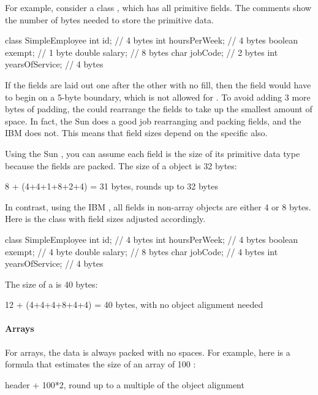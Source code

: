 For example, consider a class , which has all primitive fields.
The comments show the number of bytes needed to store the primitive data.

\begin{shortlisting}
class SimpleEmployee {
    int id;               // 4 bytes
    int hoursPerWeek;     // 4 bytes       
    boolean exempt;       // 1 byte          
    double salary;        // 8 bytes          
    char jobCode;         // 2 bytes           
    int yearsOfService;   // 4 bytes      	
}
\end{shortlisting}

If the fields are laid out one after the other with no fill, then the
field  would have to begin on a 5-byte boundary, which is not allowed for
. To avoid adding 3 more bytes of padding, the \jre could rearrange the fields
to take up the smallest amount of space. In fact, the Sun \jre does a good job rearranging and
packing fields, and the IBM \jre does not. This means that field sizes depend on the specific \jre also. 

Using the Sun \jre, you can assume each field is the size of its primitive data type because the fields are packed. The size of a
 object is 32 bytes:

\begin{shortlisting}               
8 + (4+4+1+8+2+4) = 31 bytes, rounds up to 32 bytes
\end{shortlisting} 

In contrast, using the IBM \jre, all fields in non-array objects are either 4 or
8 bytes. Here is the  class with field sizes adjusted
accordingly.
\begin{shortlisting} 
class SimpleEmployee {
    int id;                  // 4 bytes
    int hoursPerWeek;        // 4 bytes
    boolean exempt;          // 4 byte
    double salary;           // 8 bytes
    char jobCode;            // 4 bytes
    int yearsOfService;      // 4 bytes
}
\end{shortlisting}
The size of a  is 40 bytes:
\begin{shortlisting}
12 + (4+4+4+8+4+4) = 40 bytes, with no object alignment needed
\end{shortlisting}

\paragraph{Arrays} For arrays, the data is always packed with no spaces. For
example, here is a formula that estimates the size of an array of 100 :
\begin{shortlisting}
header + 100*2, round up to a multiple of the object alignment
\end{shortlisting}


